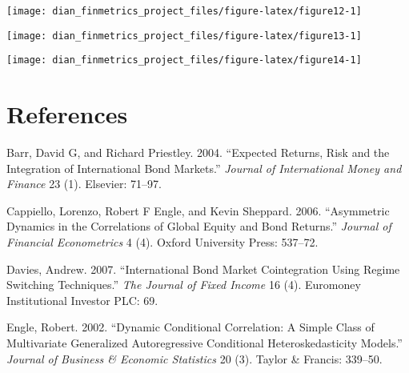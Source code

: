 \documentclass[11pt,preprint, authoryear]{elsarticle}
\let\origfigure\figure
\let\endorigfigure\endfigure
\renewenvironment{figure}[1][2] {
    \expandafter\origfigure\expandafter[H]
} {
    \endorigfigure
}
\numberwithin{equation}{section}
\numberwithin{figure}{section}
\numberwithin{table}{section}
\begin{document}
\begin{figure}[H]

{\centering \texttt{[image: dian\_finmetrics\_project\_files/figure-latex/figure12-1]} 

}

\caption{Dynanmic correlation \label{figure12}}\label{fig:figure12}
\end{figure}

\begin{figure}[H]

{\centering \texttt{[image: dian\_finmetrics\_project\_files/figure-latex/figure13-1]} 

}

\caption{Dynanmic correlation \label{figure13}}\label{fig:figure13}
\end{figure}

\begin{figure}[H]

{\centering \texttt{[image: dian\_finmetrics\_project\_files/figure-latex/figure14-1]} 

}

\caption{Dynanmic correlation \label{figure14}}\label{fig:figure14}
\end{figure}

\newpage

\section*{\texorpdfstring{References
\label{references}}{References }}\label{references}

\hypertarget{refs}{}
\hypertarget{ref-barr2004}{}
Barr, David G, and Richard Priestley. 2004. ``Expected Returns, Risk and
the Integration of International Bond Markets.'' \emph{Journal of
International Money and Finance} 23 (1). Elsevier: 71--97.

\hypertarget{ref-cappiello2006}{}
Cappiello, Lorenzo, Robert F Engle, and Kevin Sheppard. 2006.
``Asymmetric Dynamics in the Correlations of Global Equity and Bond
Returns.'' \emph{Journal of Financial Econometrics} 4 (4). Oxford
University Press: 537--72.

\hypertarget{ref-davies2007}{}
Davies, Andrew. 2007. ``International Bond Market Cointegration Using
Regime Switching Techniques.'' \emph{The Journal of Fixed Income} 16
(4). Euromoney Institutional Investor PLC: 69.

\hypertarget{ref-engle2002dynamic}{}
Engle, Robert. 2002. ``Dynamic Conditional Correlation: A Simple Class
of Multivariate Generalized Autoregressive Conditional
Heteroskedasticity Models.'' \emph{Journal of Business \& Economic
Statistics} 20 (3). Taylor \& Francis: 339--50.
\end{document}
